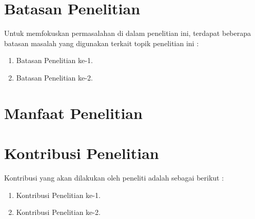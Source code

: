 \section{Batasan Penelitian}

Untuk memfokuskan permasalahan di dalam penelitian ini, terdapat beberapa batasan masalah yang digunakan terkait topik penelitian ini :

\begin{enumerate}

    \item Batasan Penelitian ke-1.
    \item Batasan Penelitian ke-2.
    
\end{enumerate}

\section{Manfaat Penelitian}

\blindtext

\section{Kontribusi Penelitian}

Kontribusi yang akan dilakukan oleh peneliti adalah sebagai berikut :

\begin{enumerate}

    \item Kontribusi Penelitian ke-1.
    \item Kontribusi Penelitian ke-2.
    
\end{enumerate}
